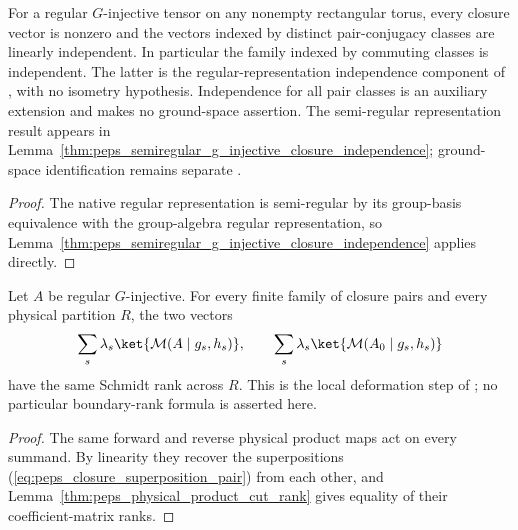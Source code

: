 \begin{lemma}%
    \label{thm:peps_regular_g_injective_closure_independence}
    \leanok
    For a regular $G$-injective tensor on any nonempty rectangular torus,
    every closure vector is nonzero and the vectors indexed by
    distinct pair-conjugacy classes are linearly independent. In
    particular the family indexed by commuting classes is independent.
    The latter is the regular-representation independence component of
    \cite[Theorem~5.9]{Schuch2010PEPS}, with no isometry hypothesis.
    Independence for all pair classes is an auxiliary extension and
    makes no ground-space assertion. The semi-regular representation result appears in
    Lemma~\ref{thm:peps_semiregular_g_injective_closure_independence};
    ground-space identification remains separate
    \cite{gap:rmp_peps_quantum_double_g_isometry}.
\end{lemma}

\begin{proof}\leanok
    The native regular representation is semi-regular by its group-basis
    equivalence with the group-algebra regular representation, so
    Lemma~\ref{thm:peps_semiregular_g_injective_closure_independence} applies directly.
\end{proof}

\begin{lemma}%
    \label{thm:peps_regular_g_injective_closure_rank_transport}
    \leanok
    Let $A$ be regular $G$-injective. For every finite family of closure
    pairs and every physical partition $R$, the two vectors
    \begin{align}
        \sum_s\lambda_s\ket{\mathcal M(A\mid g_s,h_s)},\qquad
        \sum_s\lambda_s\ket{\mathcal M(A_0\mid g_s,h_s)}
        \label{eq:peps_closure_superposition_pair}
    \end{align}
    have the same Schmidt rank across $R$. This is the local
    deformation step of \cite[Corollary~6.10]{Schuch2010PEPS}; no
    particular boundary-rank formula is asserted here.
\end{lemma}

\begin{proof}\leanok
    The same forward and reverse physical product maps act on every
    summand. By linearity they recover the superpositions
    (\ref{eq:peps_closure_superposition_pair}) from each other, and Lemma~\ref{thm:peps_physical_product_cut_rank}
    gives equality of their coefficient-matrix ranks.
\end{proof}
